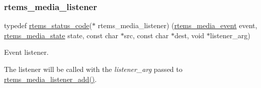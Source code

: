 \subsubsection{\texorpdfstring{rtems\_media\_listener}{rtems\_media\_listener}}
{\footnotesize\ttfamily typedef \mbox{\hyperlink{group__ClassicStatus_ga545d41846817eaba6143d52ee4d9e9fe}{rtems\+\_\+status\+\_\+code}}($\ast$ rtems\+\_\+media\+\_\+listener) (\mbox{\hyperlink{group__RTEMSIOMedia_gadd58c5799ee997413d4d6be2ac05197b}{rtems\+\_\+media\+\_\+event}} event, \mbox{\hyperlink{group__RTEMSIOMedia_gaaec542a8c74e36e4edf774f2313fcd7c}{rtems\+\_\+media\+\_\+state}} state, const char $\ast$src, const char $\ast$dest, void $\ast$listener\+\_\+arg)}



Event listener. 

The listener will be called with the {\itshape listener\+\_\+arg} passed to \mbox{\hyperlink{group__RTEMSIOMedia_ga6f362dfc1a9ad18caeaca0debb68e9d9}{rtems\+\_\+media\+\_\+listener\+\_\+add()}}.

